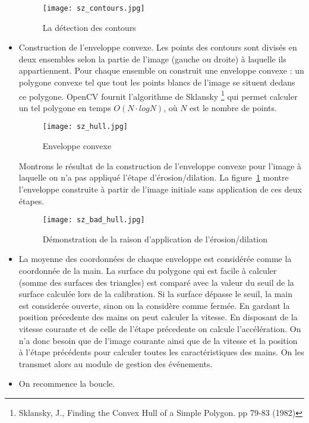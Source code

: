 \begin{itemize}
		\begin{figure}[h!]
    		\centering
    		\texttt{[image: sz\_contours.jpg]}
    		\caption{La détection des contours}
		\end{figure}
    
    \item Construction de l'enveloppe convexe. Les points des contours sont  divisés en deux ensembles selon la partie de l'image (gauche ou droite) à  laquelle ils appartiennent. Pour chaque ensemble on construit une  enveloppe convexe : un polygone convexe tel que tout les points blancs de l'image se situent dedans ce polygone. OpenCV fournit l'algorithme de Sklansky \footnote{Sklansky, J.,  Finding the Convex Hull of a Simple Polygon. pp 79-83 (1982)} qui permet calculer un tel polygone en temps $O(N \cdot log N)$, où $N$ est le nombre de points.
                
		\begin{figure}[h!]
    		\centering
    		\texttt{[image: sz\_hull.jpg]}
    		\caption{Enveloppe convexe}
		\end{figure}

		\par Montrons le résultat de la construction de l'enveloppe convexe pour l'image à laquelle on n'a pas appliqué l'étape d'érosion/dilation. La figure~\ref{erosion} montre l'enveloppe construite à partir de l'image initiale sans application de ces deux étapes.

		\begin{figure}[h!]
		    \centering
		    \texttt{[image: sz\_bad\_hull.jpg]}
		    \caption{Démonstration de la raison d'application de l'érosion/dilation}
		    \label{erosion}
		\end{figure}

    \item La moyenne des coordonnées de chaque enveloppe est considérée comme la  coordonnée de la main. La surface du polygone qui est facile à calculer (somme des surfaces des triangles) est comparé avec la valeur du seuil de la surface calculée lors de la calibration. Si la surface dépasse le seuil, la main est considerée ouverte, sinon on la considère comme fermée. En gardant la position précedente des mains on peut calculer la vitesse. En disposant de la vitesse courante et de celle de l'étape précedente on calcule l'accélération. On n'a donc besoin que de l'image courante ainsi que de la vitesse et la position à l'étape précédents pour calculer toutes les caractéristiques des mains. On les transmet alors au module de gestion des événements.

    \item On recommence la boucle.
\end{itemize}

